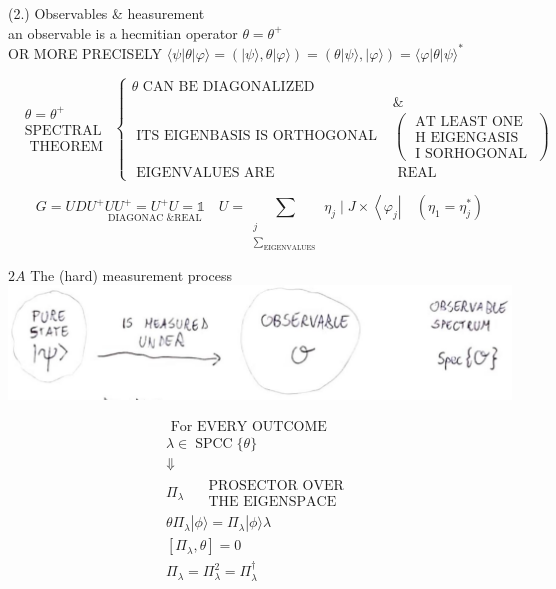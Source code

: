 \documentclass[10pt]{article}
\begin{document}
(2.) Observables \& heasurement\\
an observable is a hecmitian operator $\theta=\theta^{+}$\\
OR MORE PRECISELY $\langle\psi| \theta|\varphi\rangle=(|\psi\rangle, \theta|\varphi\rangle)=(\theta|\psi\rangle,|\varphi\rangle)=\langle\varphi| \theta|\psi\rangle^{*}$

$$
\begin{aligned}
& \theta=\theta^{+} \\
& \text {SPECTRAL } \\
& \text { THEOREM }
\end{aligned}\left\{\begin{array}{ccc}
\theta \text { CAN BE DIAGONALIZED } & \\
& \& & \\
\text { ITS EIGENBASIS IS ORTHOGONAL } & \left(\begin{array}{c}
\text { AT LEAST ONE } \\
\text { H EIGENGASIS } \\
\text { I SORHOGONAL }
\end{array}\right) \\
\text { EIGENVALUES ARE } & \text { REAL } &
\end{array}\right.
$$

$$
G=U D U^{+} \underset{\text { DIAGONAC \& REAL }}{U U^{+}=U^{+} U=\mathbb{1}} \quad U=\sum_{\substack{j \\ \sum_{\text {EIGENVALUES }}}} \eta_{j} \mid J \times\left\langle\varphi_{j}\right| \quad\left(\eta_{1}=\eta_{j}^{*}\right)
$$

$2 A$ The (hard) measurement process\\
\includegraphics[max width=\textwidth, center]{2025_10_16_f02af6fa434c9f0bcc00g-06}

$$
\begin{gathered}
\text { For EVERY OUTCOME } \\
\lambda \in \operatorname{SPCC}\{\theta\} \\
\Downarrow \\
\Pi_{\lambda} \quad \begin{array}{c}
\text { PROSECTOR OVER } \\
\text { THE EIGENSPACE }
\end{array} \\
\theta \Pi_{\lambda}|\phi\rangle=\Pi_{\lambda}|\phi\rangle \lambda \\
{\left[\Pi_{\lambda}, \theta\right]=0} \\
\Pi_{\lambda}=\Pi_{\lambda}^{2}=\Pi_{\lambda}^{\dagger}
\end{gathered}
$$
\end{document}
